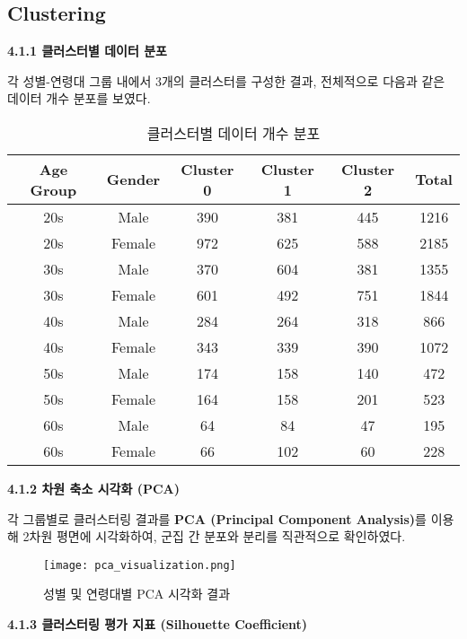 \documentclass[sigconf]{acmart}
\begin{document}
\begin{CJK}{UTF8}{mj}
\subsection{Clustering}

\noindent\textbf{4.1.1 클러스터별 데이터 분포}\par

각 성별-연령대 그룹 내에서 3개의 클러스터를 구성한 결과, 전체적으로 다음과 같은 데이터 개수 분포를 보였다.

\begin{table}[H]
\centering
\caption{클러스터별 데이터 개수 분포}
\begin{tabular}{|c|c|c|c|c|c|}
\hline
\textbf{Age Group} & \textbf{Gender} & \textbf{Cluster 0} & \textbf{Cluster 1} & \textbf{Cluster 2} & \textbf{Total} \\
\hline
20s & Male   & 390  & 381  & 445  & 1216 \\
20s & Female & 972  & 625  & 588  & 2185 \\
30s & Male   & 370  & 604  & 381  & 1355 \\
30s & Female & 601  & 492  & 751  & 1844 \\
40s & Male   & 284  & 264  & 318  & 866  \\
40s & Female & 343  & 339  & 390  & 1072 \\
50s & Male   & 174  & 158  & 140  & 472  \\
50s & Female & 164  & 158  & 201  & 523  \\
60s & Male   & 64   & 84   & 47   & 195  \\
60s & Female & 66   & 102  & 60   & 228  \\
\hline
\end{tabular}
\end{table}

\noindent\textbf{4.1.2 차원 축소 시각화 (PCA)}\par

각 그룹별로 클러스터링 결과를 \textbf{PCA (Principal Component Analysis)}를 이용해 2차원 평면에 시각화하여, 군집 간 분포와 분리를 직관적으로 확인하였다.

\begin{figure}[H]
  \centering
  \texttt{[image: pca\_visualization.png]}
  \caption{성별 및 연령대별 PCA 시각화 결과}
  \label{fig:pca_all}
\end{figure}

\noindent\textbf{4.1.3 클러스터링 평가 지표 (Silhouette Coefficient)}\par


\end{CJK}
\end{document}
